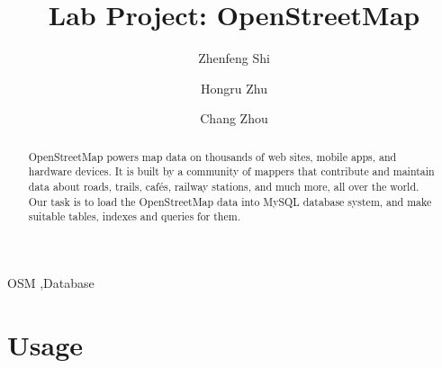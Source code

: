\documentclass[final,1p,times]{elsarticle}
\begin{document}
\begin{frontmatter}


\title{Lab Project: OpenStreetMap}




\author{Zhenfeng Shi}
\author{Hongru Zhu}
\author{Chang Zhou}

\address{5130309777, 5130309784, 5130309787}

\begin{abstract}
OpenStreetMap powers map data on thousands of web sites, mobile apps, and hardware devices. It is built by a community of mappers that contribute and maintain data about roads, trails, cafés, railway stations, and much more, all over the world. Our task is to load the OpenStreetMap data into MySQL database system, and make suitable tables, indexes and queries for them.
\end{abstract}

\begin{keyword}
OSM \sep Database


\end{keyword}

\end{frontmatter}

\linenumbers

\section{Usage}
\end{document}

